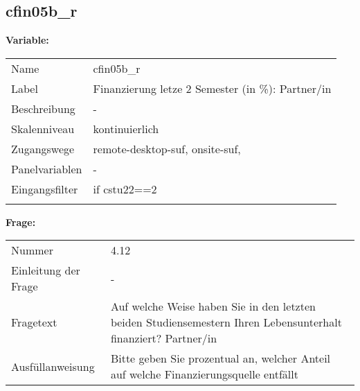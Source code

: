 	
	
	\subsection{cfin05b\_r}
	\label{subSection:cfin05b_r}

	\noindent\textbf{Variable:}\\
		\begin{tabular}{lL{11.3cm}}
			\label{tableVariable:cfin05b_r}
			Name & cfin05b\_r \\
			Label & Finanzierung letze 2 Semester (in \%): Partner/in \\
			Beschreibung & - \\
			Skalenniveau & kontinuierlich \\
			Zugangswege &
				remote-desktop-suf,
				onsite-suf,
 \\
			Panelvariablen & -
			 \\
			Eingangsfilter & if cstu22==2 \\
 \\
		\end{tabular}

		\vspace*{1 cm}
		\noindent\textbf{Frage:}\\
		\begin{tabular}{lL{11.3cm}}
			\label{tableQuestion:cfin05b_r}
			Nummer & 4.12 \\
			Einleitung der Frage & - \\
			Fragetext & Auf welche Weise haben Sie in den letzten beiden Studiensemestern Ihren Lebensunterhalt finanziert?
Partner/in \\
			Ausfüllanweisung & Bitte geben Sie prozentual an, welcher Anteil auf welche Finanzierungsquelle entfällt \\
		\end{tabular}




